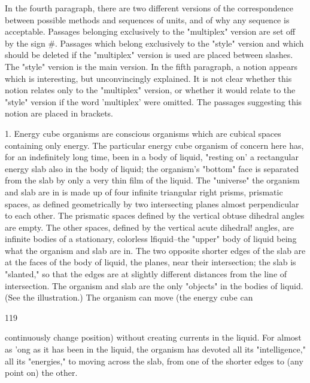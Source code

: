 \documentclass[10pt,twoside]{memoir}
\begin{document}
\begin{enumerate}
{{{{{{{{{{{{{{{In the fourth paragraph, there are two different versions of the 
correspondence between possible methods and sequences of units, and of 
why any sequence is acceptable. Passages belonging exclusively to the 
"multiplex" version are set off by the sign #. Passages which belong 
exclusively to the "style" version and which should be deleted if the 
"multiplex" version is used are placed between slashes. The "style" version is 
the main version. In the fifth paragraph, a notion appears which is 
interesting, but unconvincingly explained. It is not clear whether this notion 
relates only to the "multiplex" version, or whether it would relate to the 
"style" version if the word 'multiplex' were omitted. The passages suggesting 
this notion are placed in brackets. 


1. Energy cube organisms are conscious organisms which are cubical 
spaces containing only energy. The particular energy cube organism of 
concern here has, for an indefinitely long time, been in a body of liquid, 
"resting on' a rectangular energy slab also in the body of liquid; the 
organism's "bottom" face is separated from the slab by only a very thin film 
of the liquid. The "universe" the organism and slab are in is made up of four 
infinite triangular right prisms, prismatic spaces, as defined geometrically by 
two intersecting planes almost perpendicular to each other. The prismatic 
spaces defined by the vertical obtuse dihedral angles are empty. The other 
spaces, defined by the vertical acute dihedral! angles, are infinite bodies of a 
stationary, colorless lfiquid--the "upper" body of liquid being what the 
organism and slab are in. The two opposite shorter edges of the slab are at 
the faces of the body of liquid, the planes, near their intersection; the slab is 
"slanted," so that the edges are at slightly different distances from the line 
of intersection. The organism and slab are the only "objects" in the bodies 
of liquid. (See the illustration.) The organism can move (the energy cube can 


119 


continuously change position) without creating currents in the liquid. For 
almost as 'ong as it has been in the liquid, the organism has devoted all its 
"intelligence," all its "energies," to moving across the slab, from one of the 
shorter edges to (any point on) the other. 

}}}}}}}}}}}}}}}
\end{enumerate}
\end{document}
